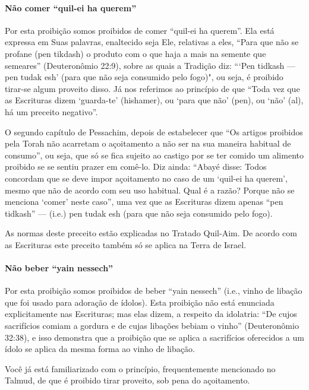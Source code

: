 \paragraph{Não comer ``quil-ei ha querem''}

Por esta proibição somos proibidos de comer ``quil-ei ha querem''. Ela
está expressa em Suas palavras, enaltecido seja Ele, relativas a eles,
``Para que não se profane (pen tikdash) o produto com o que haja a mais
na semente que semeares'' (Deuteronômio 22:9), sobre as quais a Tradição
diz: ```Pen tidkash --- pen tudak esh' (para que não seja consumido
pelo fogo)", ou seja, é proibido tirar-se algum proveito disso. Já nos
referimos ao princípio de que ``Toda vez que as Escrituras dizem
`guarda-te' (hishamer), ou `para que não' (pen), ou `não' (al), há um
preceito negativo''.

O segundo capítulo de Pessachim, depois de estabelecer que ``Os artigos
proibidos pela Torah não acarretam o açoitamento a não ser na sua
maneira habitual de consumo'', ou seja, que só se fica sujeito ao
castigo por se ter comido um alimento proibido se se sentiu prazer em
comê-lo. Diz ainda: ``Abayé disse: Todos concordam que se deve impor
açoitamento no caso de um `quil-ei ha querem', mesmo que não de acordo
com seu uso habitual. Qual é a razão? Porque não se menciona `comer'
neste caso'', uma vez que as Escrituras dizem apenas ``pen tidkash''
--- (i.e.) pen tudak esh (para que não seja consumido pelo fogo).

As normas deste preceito estão explicadas no Tratado Quil-Aim. De acordo
com as Escrituras este preceito também só se aplica na Terra de Israel.

\paragraph{Não beber ``yain nessech''}

Por esta proibição somos proibidos de beber ``yain nessech'' (i.e.,
vinho de libação que foi usado para adoração de ídolos). Esta proibição
não está enunciada explicitamente nas Escrituras; mas elas dizem, a
respeito da idolatria: ``De cujos sacrifícios comiam a gordura e de
cujas libações bebiam o vinho'' (Deuteronômio 32:38), e isso demonstra
que a proibição que se aplica a sacrifícios oferecidos a um ídolo se
aplica da mesma forma ao vinho de libação.

Você já está familiarizado com o princípio, frequentemente mencionado
no Talmud, de que é proibido tirar proveito, sob pena do açoitamento.

